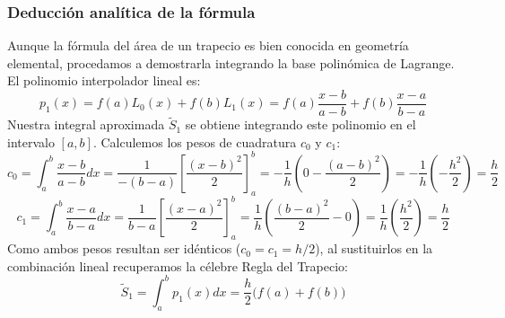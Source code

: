 \begin{center}
\end{center}

\subsubsection{Deducción analítica de la fórmula}

Aunque la fórmula del área de un trapecio es bien conocida en geometría elemental, procedamos a demostrarla integrando la base polinómica de Lagrange. El polinomio interpolador lineal es:
\[
    p_1(x) = f(a) L_0(x) + f(b) L_1(x) = f(a) \frac{x - b}{a - b} + f(b) \frac{x - a}{b - a}
\]
Nuestra integral aproximada $\widetilde{S}_1$ se obtiene integrando este polinomio en el intervalo $[a, b]$. Calculemos los pesos de cuadratura $c_0$ y $c_1$:
\[
    c_0 = \int_a^b \frac{x - b}{a - b} dx = \frac{1}{-(b-a)} \left[ \frac{(x-b)^2}{2} \right]_a^b = -\frac{1}{h} \left( 0 - \frac{(a-b)^2}{2} \right) = -\frac{1}{h} \left( -\frac{h^2}{2} \right) = \frac{h}{2}
\]
\[
    c_1 = \int_a^b \frac{x - a}{b - a} dx = \frac{1}{b-a} \left[ \frac{(x-a)^2}{2} \right]_a^b = \frac{1}{h} \left( \frac{(b-a)^2}{2} - 0 \right) = \frac{1}{h} \left( \frac{h^2}{2} \right) = \frac{h}{2}
\]
Como ambos pesos resultan ser idénticos ($c_0 = c_1 = h/2$), al sustituirlos en la combinación lineal recuperamos la célebre Regla del Trapecio:
\[
    \boxed{\widetilde{S}_1 = \int_a^b p_1(x) dx = \frac{h}{2} \Big( f(a) + f(b) \Big)}
\]

